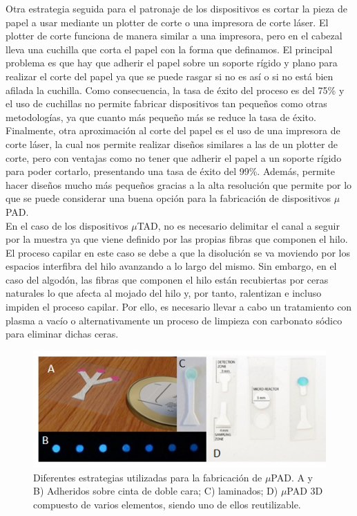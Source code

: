 \documentclass{article}
\begin{document}
Otra estrategia seguida para el patronaje de los dispositivos es cortar la pieza de papel a usar mediante un plotter de corte o una impresora de corte láser. El plotter de corte funciona de manera similar a una impresora, pero en el cabezal lleva una cuchilla que corta el papel con la forma que definamos. El principal problema es que hay que adherir el papel sobre un soporte rígido y plano para realizar el corte del papel ya que se puede rasgar si no es así o si no está bien afilada la cuchilla. Como consecuencia, la tasa de éxito del proceso es del 75\% y el uso de cuchillas no permite fabricar dispositivos tan pequeños como otras metodologías, ya que cuanto más pequeño más se reduce la tasa de éxito.\\ 

Finalmente, otra aproximación al corte del papel es el uso de una impresora de corte láser, la cual nos permite realizar diseños similares a las de un plotter de corte, pero con ventajas como no tener que adherir el papel a un soporte rígido para poder cortarlo, presentando una tasa de éxito del 99\%. Además, permite hacer diseños mucho más pequeños gracias a la alta resolución que permite por lo que se puede considerar una buena opción para la fabricación de dispositivos $\mu$PAD. \\

En el caso de los dispositivos $\mu$TAD, no es necesario delimitar el canal a seguir por la muestra ya que viene definido por las propias fibras que componen el hilo. El proceso capilar en este caso se debe a que la disolución se va moviendo por los espacios interfibra del hilo avanzando a lo largo del mismo. Sin embargo, en el caso del algodón, las fibras que componen el hilo están recubiertas por ceras naturales lo que afecta al mojado del hilo y, por tanto, ralentizan e incluso impiden el proceso capilar. Por ello, es necesario llevar a cabo un tratamiento con plasma a vacío o alternativamente un proceso de limpieza con carbonato sódico para eliminar dichas ceras\cite{Nilghaz2013}.\\

\begin{figure}[h]
\includegraphics[width=\textwidth]{moneda}
\caption{Diferentes estrategias utilizadas para la fabricación de $\mu$PAD. A y B) Adheridos sobre cinta de doble cara; C) laminados; D) $\mu$PAD 3D compuesto de varios elementos, siendo uno de ellos reutilizable. }
\label{fig:moneda}
\end{figure}
\end{document}
